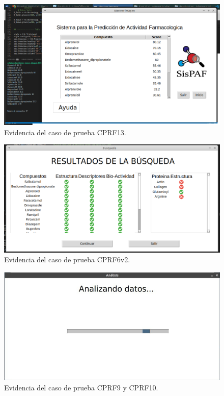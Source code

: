 \begin{figure}[H]
    \centering
    \includegraphics[scale=0.55]{Anexo/imagenes/Imagenes_Pruebas/CPRF13.png}
    \caption{Evidencia del caso de prueba CPRF13.}
    \label{CPR13}
\end{figure}

\begin{figure}[H]
    \centering
    \includegraphics[scale=0.55]{Anexo/imagenes/Imagenes_Pruebas/CPRF6v2.png}
    \caption{Evidencia del caso de prueba CPRF6v2.}
    \label{CPRF6v2}
\end{figure}

\begin{figure}[H]
    \centering
    \includegraphics[scale=0.63]{Anexo/imagenes/Imagenes_Pruebas/CPRF9.png}
    \caption{Evidencia del caso de prueba CPRF9 y CPRF10.}
    \label{CPRF9-10}
\end{figure}

